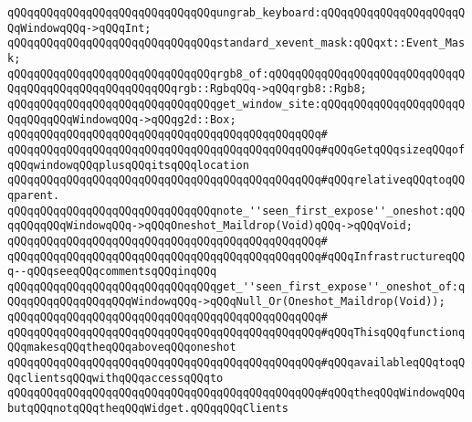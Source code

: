 \verb|qQQqqQQqqQQqqQQqqQQqqQQqqQQqqQQqungrab_keyboard:qQQqqQQqqQQqqQQqqQQqqQQqWindowqQQq->qQQqInt;|\newline
\newline
\verb|qQQqqQQqqQQqqQQqqQQqqQQqqQQqqQQqstandard_xevent_mask:qQQqxt::Event_Mask;|\newline
\newline
\verb|qQQqqQQqqQQqqQQqqQQqqQQqqQQqqQQqrgb8_of:qQQqqQQqqQQqqQQqqQQqqQQqqQQqqQQqqQQqqQQqqQQqqQQqqQQqqQQqrgb::RgbqQQq->qQQqrgb8::Rgb8;|\newline
\newline
\newline
\verb|qQQqqQQqqQQqqQQqqQQqqQQqqQQqqQQqget_window_site:qQQqqQQqqQQqqQQqqQQqqQQqqQQqqQQqWindowqQQq->qQQqg2d::Box;|\newline
\verb|qQQqqQQqqQQqqQQqqQQqqQQqqQQqqQQqqQQqqQQqqQQqqQQq#|\newline
\verb|qQQqqQQqqQQqqQQqqQQqqQQqqQQqqQQqqQQqqQQqqQQqqQQq#qQQqGetqQQqsizeqQQqofqQQqwindowqQQqplusqQQqitsqQQqlocation|\newline
\verb|qQQqqQQqqQQqqQQqqQQqqQQqqQQqqQQqqQQqqQQqqQQqqQQq#qQQqrelativeqQQqtoqQQqparent.|\newline
\newline
\verb|qQQqqQQqqQQqqQQqqQQqqQQqqQQqqQQqnote_''seen_first_expose''_oneshot:qQQqqQQqqQQqWindowqQQq->qQQqOneshot_Maildrop(Void)qQQq->qQQqVoid;|\newline
\verb|qQQqqQQqqQQqqQQqqQQqqQQqqQQqqQQqqQQqqQQqqQQqqQQq#|\newline
\verb|qQQqqQQqqQQqqQQqqQQqqQQqqQQqqQQqqQQqqQQqqQQqqQQq#qQQqInfrastructureqQQq--qQQqseeqQQqcommentsqQQqinqQQq|\newline
\newline
\verb|qQQqqQQqqQQqqQQqqQQqqQQqqQQqqQQqget_''seen_first_expose''_oneshot_of:qQQqqQQqqQQqqQQqqQQqWindowqQQq->qQQqNull_Or(Oneshot_Maildrop(Void));|\newline
\verb|qQQqqQQqqQQqqQQqqQQqqQQqqQQqqQQqqQQqqQQqqQQqqQQq#|\newline
\verb|qQQqqQQqqQQqqQQqqQQqqQQqqQQqqQQqqQQqqQQqqQQqqQQq#qQQqThisqQQqfunctionqQQqmakesqQQqtheqQQqaboveqQQqoneshot|\newline
\verb|qQQqqQQqqQQqqQQqqQQqqQQqqQQqqQQqqQQqqQQqqQQqqQQq#qQQqavailableqQQqtoqQQqclientsqQQqwithqQQqaccessqQQqto|\newline
\verb|qQQqqQQqqQQqqQQqqQQqqQQqqQQqqQQqqQQqqQQqqQQqqQQq#qQQqtheqQQqWindowqQQqbutqQQqnotqQQqtheqQQqWidget.qQQqqQQqClients|\newline
